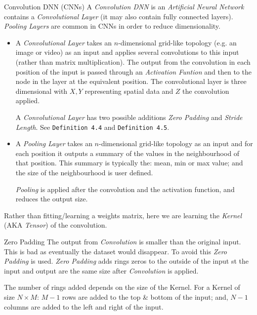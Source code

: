 \documentclass[11pt,a4paper]{article}
\begin{document}
  \begin{definition}{Convolution DNN (CNNs)}
    A \textit{Convolution DNN} is an \textit{Artificial Neural Network} contains a \textit{Convolutional Layer} (it may also contain fully connected layers). \textit{Pooling Layers} are common in CNNs in order to reduce dimensionality.

    \begin{itemize}
      \item A \textit{Convolutional Layer} takes an $n$-dimensional grid-like topology (e.g. an image or video) as an input and applies several convolutions to this input (rather than matrix multiplication). The output from the convolution in each position of the input is passed through an \textit{Activation Funtion} and then to the node in the layer at the equivalent position. The convolutional layer is three dimensional with $X,Y$ representing spatial data and $Z$ the convolution applied.
      \par A \textit{Convolutional Layer} has two possible additions \textit{Zero Padding} and \textit{Stride Length}. See \texttt{Definition 4.4} and \texttt{Definition 4.5}.
      \item A \textit{Pooling Layer} takes an $n$-dimensional grid-like topology as an input and for each position it outputs a summary of the values in the neighbourhood of that position. This summary is typically the: mean, min or max value; and the size of the neighbourhood is user defined.
      \par \textit{Pooling} is applied after the convolution and the activation function, and reduces the output size.
    \end{itemize}
    Rather than fitting/learning a weights matrix, here we are learning the \textit{Kernel} (AKA \textit{Tensor}) of the convolution.
  \end{definition}

  \begin{definition}{Zero Padding}
    The output from \textit{Convolution} is smaller than the original input. This is bad as eventually the dataset would disappear. To avoid this \textit{Zero Padding} is used. \textit{Zero Padding} adds rings zeros to the outside of the input st the input and output are the same size after \textit{Convolution} is applied.
    \par The number of rings added depends on the size of the Kernel. For a Kernel of size $N\times M$: $M-1$ rows are added to the top \& bottom of the input; and, $N-1$ columns are added to the left and right of the input.
  \end{definition}
\end{document}
